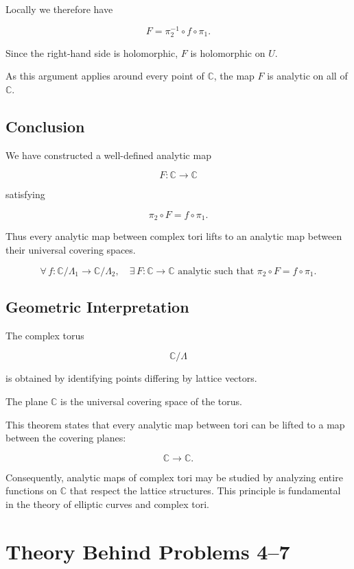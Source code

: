 \documentclass[12pt,a4paper]{article}
\theoremstyle{notespace}
\begin{document}
Locally we therefore have

\[
F
=
\pi_2^{-1}\circ f\circ\pi_1.
\]

Since the right-hand side is holomorphic, \(F\) is holomorphic on \(U\).

As this argument applies around every point of \(\mathbb C\), the map \(F\) is analytic on all of \(\mathbb C\).

\subsection{Conclusion}

We have constructed a well-defined analytic map

\[
F:\mathbb C\to\mathbb C
\]

satisfying

\[
\boxed{
	\pi_2\circ F
	=
	f\circ\pi_1.
}
\]

Thus every analytic map between complex tori lifts to an analytic map between their universal covering spaces.

\[
\boxed{
	\forall\,f:\mathbb C/\Lambda_1\to\mathbb C/\Lambda_2,
	\quad
	\exists\,F:\mathbb C\to\mathbb C
	\text{ analytic such that }
	\pi_2\circ F=f\circ\pi_1.
}
\]

\subsection{Geometric Interpretation}

The complex torus

\[
\mathbb C/\Lambda
\]

is obtained by identifying points differing by lattice vectors.

The plane \(\mathbb C\) is the universal covering space of the torus.

This theorem states that every analytic map between tori can be lifted to a map between the covering planes:

\[
\mathbb C
\longrightarrow
\mathbb C.
\]

Consequently, analytic maps of complex tori may be studied by analyzing entire functions on \(\mathbb C\) that respect the lattice structures. This principle is fundamental in the theory of elliptic curves and complex tori.


\section{Theory Behind Problems 4--7}
\end{document}
